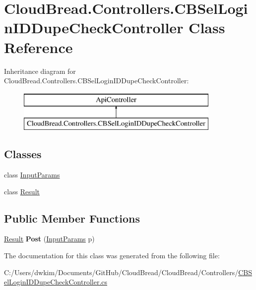 \hypertarget{a00050}{}\section{Cloud\+Bread.\+Controllers.\+C\+B\+Sel\+Login\+I\+D\+Dupe\+Check\+Controller Class Reference}
\label{a00050}
Inheritance diagram for Cloud\+Bread.\+Controllers.\+C\+B\+Sel\+Login\+I\+D\+Dupe\+Check\+Controller\+:\begin{figure}[H]
\begin{center}
\leavevmode
\includegraphics[height=2.000000cm]{a00050}
\end{center}
\end{figure}
\subsection*{Classes}
\begin{DoxyCompactItemize}
\item 
class \hyperlink{a00091}{Input\+Params}
\item 
class \hyperlink{a00174}{Result}
\end{DoxyCompactItemize}
\subsection*{Public Member Functions}
\begin{DoxyCompactItemize}
\item 
\hyperlink{a00174}{Result} {\bfseries Post} (\hyperlink{a00091}{Input\+Params} p)\hypertarget{a00050_ae6a1e88ad907f08f710be974100e1f17}{}\label{a00050_ae6a1e88ad907f08f710be974100e1f17}

\end{DoxyCompactItemize}


The documentation for this class was generated from the following file\+:\begin{DoxyCompactItemize}
\item 
C\+:/\+Users/dwkim/\+Documents/\+Git\+Hub/\+Cloud\+Bread/\+Cloud\+Bread/\+Controllers/\hyperlink{a00221}{C\+B\+Sel\+Login\+I\+D\+Dupe\+Check\+Controller.\+cs}\end{DoxyCompactItemize}
